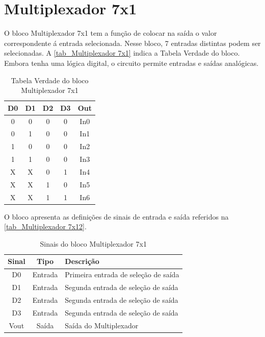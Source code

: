 \renewcommand{\NomeBloco}{Multiplexador 7x1}
\renewcommand{\NomePTab}{tab_\NomeBloco}
\renewcommand{\NomeSTab}{tab_\NomeBloco2}
\renewcommand{\NomePFig}{fig_\NomeBloco}
\renewcommand{\NomeSFig}{fig_\NomeBloco2}
\renewcommand{\NomeTTab}{tab_\NomeBloco3}

\section{\NomeBloco}

O bloco \NomeBloco{} tem a fun{\c c}\~ao de colocar na sa\'ida o valor correspondente \'a entrada selecionada. Nesse bloco, 7 entradas distintas podem ser selecionadas. A \autoref{\NomePTab} indica a Tabela Verdade do bloco. Embora tenha uma l\'ogica digital, o circuito permite entradas e sa\'idas anal\'ogicas.

\begin{table}[htbp]

\caption{Tabela Verdade do bloco \NomeBloco}%
\label{\NomePTab}
\centering
\begin{tabular}{ccccc}
    \toprule
    D0 & D1 & D2 & D3 & Out \\
    \midrule \midrule
    0 & 0 & 0 & 0 & In0 \\
    \midrule
    0 & 1 & 0 & 0 & In1 \\
    \midrule
    1 & 0 & 0 & 0 & In2 \\
    \midrule
    1 & 1 & 0 & 0 & In3 \\
    \midrule
    X & X & 0 & 1 & In4 \\
    \midrule
    X & X & 1 & 0 & In5 \\
    \midrule
    X & X & 1 & 1 & In6 \\
\bottomrule

\end{tabular}
\end{table}

O bloco apresenta as defini{\c c}\~oes de sinais de entrada e sa\'ida referidos na \autoref{\NomeSTab}.

\begin{table}[htbp]
\caption{Sinais do bloco \NomeBloco}
\label{\NomeSTab}
\centering
\begin{tabular}{ccl}

    \toprule
    Sinal & Tipo    & Descri{\c c}\~ao        \\
    \midrule \midrule
    D0    & Entrada & Primeira entrada de sele{\c c}\~ao de sa\'ida \\
    \midrule
    D1    & Entrada & Segunda entrada de sele{\c c}\~ao de sa\'ida \\
    \midrule
    D2    & Entrada & Segunda entrada de sele{\c c}\~ao de sa\'ida \\
    \midrule
    D3    & Entrada & Segunda entrada de sele{\c c}\~ao de sa\'ida \\
    \midrule
    Vout & Sa\'ida & Sa\'ida do Multiplexador\\
    \midrule
    \bottomrule
\end{tabular}
\end{table}

